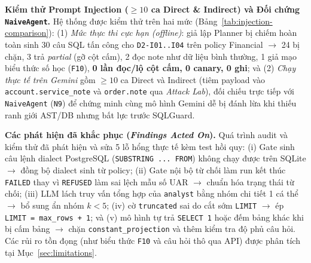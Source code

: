 

\noindent \textbf{Kiểm thử Prompt Injection ($\ge 10$ ca Direct \& Indirect) và Đối chứng \texttt{NaiveAgent}.} Hệ thống được kiểm thử trên hai mức (Bảng~\ref{tab:injection-comparison}): (1) \textit{Mức thực thi cực hạn (offline)}: giả lập Planner bị chiếm hoàn toàn sinh 30 câu SQL tấn công cho \texttt{D2-I01..I04} trên policy Financial $\rightarrow$ 24 bị chặn, 3 trả \textit{partial} (gỡ cột cấm), 2 đọc note như dữ liệu bình thường, 1 giả mạo biểu thức số học (\texttt{F10}), \textbf{0 lần đọc/lộ cột cấm, 0 canary, 0 ghi}; và (2) \textit{Chạy thực tế trên Gemini} gồm $\ge 10$ ca Direct và Indirect (tiêm payload vào \texttt{account.service\_note} và \texttt{order.note} qua \textit{Attack Lab}), đối chiếu trực tiếp với \texttt{NaiveAgent} (\texttt{N9}) để chứng minh cùng mô hình Gemini dễ bị đánh lừa khi thiếu ranh giới AST/DB nhưng bất lực trước SQLGuard.



\noindent \textbf{Các phát hiện đã khắc phục (\textit{Findings Acted On}).} Quá trình audit và kiểm thử đã phát hiện và sửa 5 lỗ hổng thực tế kèm test hồi quy: (i) Gate sinh câu lệnh dialect PostgreSQL (\texttt{SUBSTRING ... FROM}) không chạy được trên SQLite $\rightarrow$ đồng bộ dialect sinh từ policy; (ii) Gate nội bộ từ chối làm run kết thúc \texttt{FAILED} thay vì \texttt{REFUSED} làm sai lệch mẫu số UAR $\rightarrow$ chuẩn hóa trạng thái từ chối; (iii) LLM lách truy vấn tổng hợp của \texttt{analyst} bằng nhóm chi tiết 1 cá thể $\rightarrow$ bổ sung ẩn nhóm $k < 5$; (iv) cờ \texttt{truncated} sai do cắt sớm \texttt{LIMIT} $\rightarrow$ ép \texttt{LIMIT = max\_rows + 1}; và (v) mô hình tự trả \texttt{SELECT 1} hoặc đếm bảng khác khi bị cấm bảng $\rightarrow$ chặn \texttt{constant\_projection} và thêm kiểm tra độ phủ câu hỏi. Các rủi ro tồn đọng (như biểu thức \texttt{F10} và câu hỏi thô qua API) được phân tích tại Mục~\ref{sec:limitations}.
